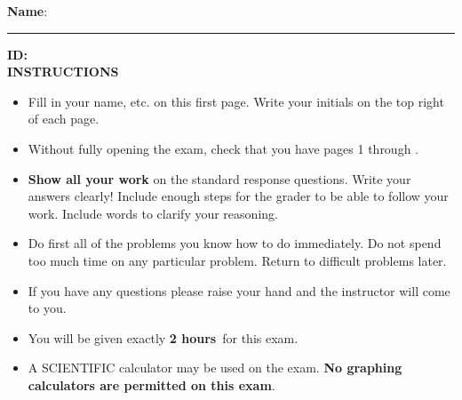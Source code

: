 \documentclass[addpoints,12pt,answers]{exam}
\newcommand{\exammin}{\textbf{2 hours}}
\begin{document}
\phantom{.}
\vspace{.2cm}

\noindent \textbf{Name}: 
\rule{.5\textwidth}{.2mm} \hspace{1cm} \textbf{ID:}
\hrulefill \\ 



\vspace{.2cm}
\textbf{INSTRUCTIONS}\\
\phantom{.}\hspace{.7cm}
\begin{minipage}{6.3in}
	\begin{itemize}
		\item Fill in your name, etc. on this first page. Write your initials on the top right of each page.
		\item Without fully opening the exam, check that you have pages 1 through \totalnumpages.
		\item {\bf Show all your work} on the standard response questions. Write your answers clearly!  Include enough steps for the grader to be able to follow your work. Include words to clarify your reasoning.
		\item Do first all of the problems you know how to do immediately. Do not spend too much time on any particular problem. Return to difficult problems later.
		\item If you have any questions please raise your hand and the instructor will come to you.
		\item You will be given exactly \exammin \ for this exam.
		\item A SCIENTIFIC calculator may be used on the exam. \textbf{No graphing calculators are permitted on this exam}.
	\end{itemize}
\end{minipage}

\vspace{.2cm}

\newpage
\end{document}
